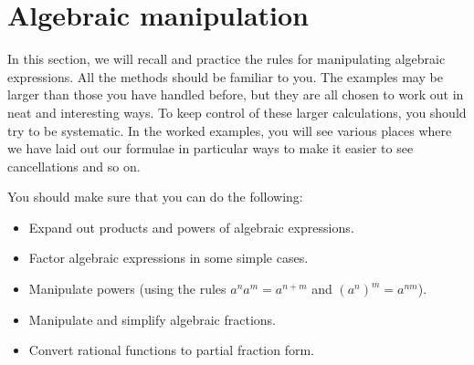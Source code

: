 \documentclass[a4paper]{book}
\renewcommand{\:}{\colon}
\theoremstyle{definition}
\begin{document}

\chapter{Algebraic manipulation}\label{chap-alg}

In this section, we will recall and practice the rules for
manipulating algebraic expressions.  All the methods should be
familiar to you.  The examples may be larger than those you have
handled before, but they are all chosen to work out in neat and
interesting ways.  To keep control of these larger calculations, you
should try to be systematic.  In the worked examples, you will see
various places where we have laid out our formulae in particular ways
to make it easier to see cancellations and so on.
\bigskip


You should make sure that you can do the following:
\begin{itemize}
 \item Expand out products and powers of algebraic expressions.
 \item Factor algebraic expressions in some simple cases.
 \item Manipulate powers (using the rules $a^na^m=a^{n+m}$ and
  $(a^n)^m=a^{nm}$).
 \item Manipulate and simplify algebraic fractions.
 \item Convert rational functions to partial fraction form.
\end{itemize}

\end{document}
